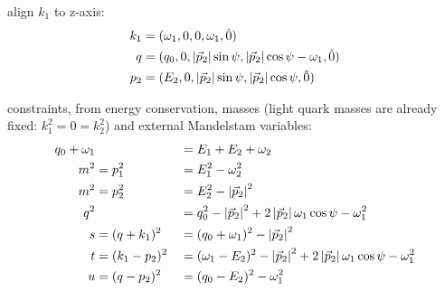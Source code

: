 align $k_1$ to z-axis:
\begin{align}
k_1 &= (\omega_1,0,0,\omega_1, \hat 0)\\
q &= (q_0,0,\left|\vec p_2\right|\sin\psi,\left|\vec p_2\right|\cos\psi-\omega_1, \hat 0)\\
p_2 &= (E_2,0,\left|\vec p_2\right|\sin\psi,\left|\vec p_2\right|\cos\psi, \hat 0)
\end{align}

constraints, from energy conservation, masses (light quark masses are already fixed: $k_1^2 = 0 = k_2^2$) and external Mandelstam variables:
\begin{align}
q_0+\omega_1 & &&=E_1+E_2+\omega_2 \label{eq:PSConIMomCon}\\
m^2 &= p_1^2 &&= E_1^2 - \omega_2^2 \label{eq:PSConIp1}\\
m^2 &= p_2^2 &&= E_2^2 - \left|\vec p_2\right|^2 \label{eq:PSConIp2} \\
q^2 & &&= q_0^2 - \left|\vec p_2\right|^2 + 2\left|\vec p_2\right|\omega_1\cos\psi-\omega_1^2 \label{eq:PSConIq}\\
s &= (q+k_1)^2 &&= (q_0+\omega_1)^2 - \left|\vec p_2\right|^2 \label{eq:PSConIs}\\
t &= (k_1-p_2)^2 &&= (\omega_1-E_2)^2-\left|\vec p_2\right|^2+2\left|\vec p_2\right|\omega_1\cos\psi-\omega_1^2 \label{eq:PSConIt}\\
u &= (q-p_2)^2 &&= (q_0-E_2)^2 - \omega_1^2 \label{eq:PSConIu}
\end{align}

